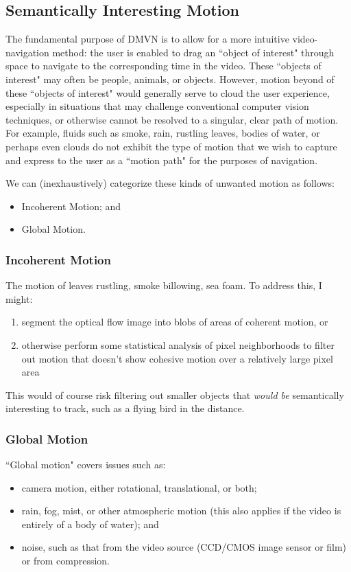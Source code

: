 \subsection{Semantically Interesting Motion}
    The fundamental purpose of DMVN is to allow for a more intuitive video-navigation method: the user is enabled to drag an ``object of interest" through space to navigate to the corresponding time in the video. These ``objects of interest" may often be people, animals, or objects. However, motion beyond of these ``objects of interest" would generally serve to cloud the user experience, especially in situations that may challenge conventional computer vision techniques, or otherwise cannot be resolved to a singular, clear path of motion. For example, fluids such as smoke, rain, rustling leaves, bodies of water, or perhaps even clouds do not exhibit the type of motion that we wish to capture and express to the user as a ``motion path" for the purposes of navigation.
\par We can (inexhaustively) categorize these kinds of unwanted motion as follows:
\begin{itemize}
\item Incoherent Motion; and
\item Global Motion.
\end{itemize}

\subsubsection{Incoherent Motion}
    The motion of leaves rustling, smoke billowing, sea foam. To address this, I might:
    \begin{enumerate}
    \item segment the optical flow image into blobs of areas of coherent motion, or
    \item otherwise perform some statistical analysis of pixel neighborhoods to filter out motion that doesn't show cohesive motion over a relatively large pixel area
    \end{enumerate}
    This would of course risk filtering out smaller objects that \emph{would be} semantically interesting to track, such as a flying bird in the distance.
\subsubsection{Global Motion}
    ``Global motion" covers issues such as:
    \begin{itemize}
    \item camera motion, either rotational, translational, or both;
    \item rain, fog, mist, or other atmospheric motion (this also applies if the video is entirely of a body of water); and
    \item noise, such as that from the video source (CCD/CMOS image sensor or film) or from compression.
    \end{itemize}

